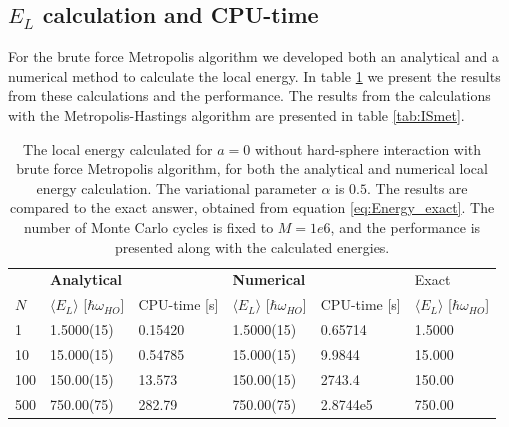 \documentclass[norsk,a4paper,12pt]{article}
\begin{document}
\subsection{$E_L$ calculation and CPU-time}\label{CPU}
For the brute force Metropolis algorithm we developed both an analytical and a numerical method to calculate the local energy. In table \ref{tab:BFmet} we present the results from these calculations and the performance. The results from the calculations with the Metropolis-Hastings algorithm are presented in table \ref{tab:ISmet}.

\begin{table} [H]
	\centering
	\caption{The local energy calculated for $a=0$  without hard-sphere interaction with brute force Metropolis algorithm, for both the analytical and numerical local energy calculation. The variational parameter $\alpha$ is $0.5$. The results are compared to the exact answer, obtained from equation \ref{eq:Energy_exact}. The number of Monte Carlo cycles is fixed to $M=1e6$, and the performance is presented along with the calculated energies. }
	\begin{tabularx}{\textwidth}{X|XX|XX|X} \hline
		\label{tab:BFmet}
		& \multicolumn{2}{X}{\textbf{Analytical}} & \multicolumn{2}{X}{\textbf{Numerical}} & Exact \\
		$N$ & $\langle E_L\rangle$ [$\hbar\omega_{HO}$] & CPU-time [s] & $\langle E_L\rangle$ [$\hbar\omega_{HO}$] & CPU-time [s]& $\langle E_L\rangle$ [$\hbar\omega_{HO}$]\\ \hline
		1 & 1.5000(15) & 0.15420 & 1.5000(15) & 0.65714 & 1.5000\\
		10 & 15.000(15) & 0.54785 & 15.000(15) & 9.9844 & 15.000\\
		100 & 150.00(15) & 13.573 & 150.00(15) & 2743.4 & 150.00\\
		500 & 750.00(75) & 282.79 & 750.00(75) & 2.8744e5 & 750.00\\ \hline
	\end{tabularx}
\end{table}
\end{document}
